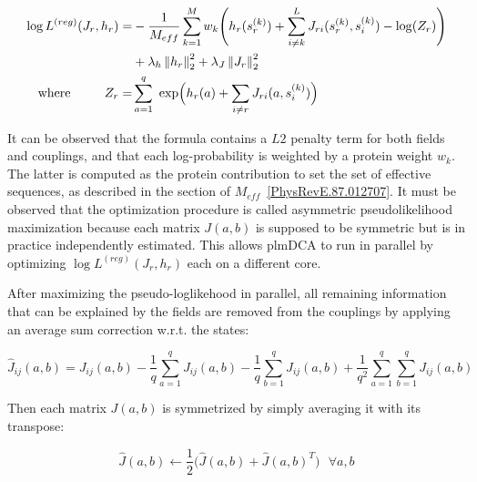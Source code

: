         \begin{equation}
            \begin{split}
                \log{L^{(reg)}}(J_r, h_r) = & -\frac{1}{M_{eff}} \sum\limits_{k=1}^M w_k \Bigg( h_r(s_r^{(k)}) 
                    + \sum\limits_{i \neq k}^L J_{ri}(s_r^{(k)}, s_i^{(k)}) - \log(Z_r) \Bigg) \\
                & + \lambda_h \left\lVert h_r\right\rVert_2^2 + \lambda_J \left\lVert J_r\right\rVert_2^2 \\
                \text{where} \ \ \ \ \ \ \ \ Z_r = & \sum\limits_{a=1}^q \text{ exp}\Big(h_r(a) + \sum\limits_{i \neq r} J_{ri}(a, s_i^{(k)})\Big)
            \end{split}
        \end{equation}

        It can be observed that the formula contains a $L2$ penalty term for both fields and couplings,
        and that each log-probability is weighted by a protein weight $w_k$.
        The latter is computed as the protein contribution to set the set of effective sequences, 
        as described in the section of $M_{eff}$~\ref{PhysRevE.87.012707}.
        It must be observed that the optimization procedure is called asymmetric pseudolikelihood maximization because 
        each matrix $J(a, b)$ is supposed to be symmetric but is in practice
        independently estimated. This allows plmDCA to run in parallel by optimizing $\log{L^{(reg)}}(J_r, h_r)$ each on a different core.

        After maximizing the pseudo-loglikehood in parallel, all remaining information 
        that can be explained by the fields are removed from the couplings by applying
        an average sum correction w.r.t. the states:

        \begin{equation}
            \hat{J}_{ij}(a, b) = J_{ij}(a, b) - \frac{1}{q} \sum\limits_{a=1}^q J_{ij}(a, b) - \frac{1}{q} \sum\limits_{b=1}^q J_{ij}(a, b) 
            + \frac{1}{q^2} \sum\limits_{a=1}^q \sum\limits_{b=1}^q J_{ij}(a, b)
        \end{equation}

        Then each matrix $J(a, b)$ is symmetrized by simply averaging it with its transpose:
        
        \begin{equation}
            \hat{J}(a, b) \leftarrow \frac{1}{2} \big( \hat{J}(a, b) + \hat{J}(a, b)^T \big) \ \ \ \forall a, b
        \end{equation}

